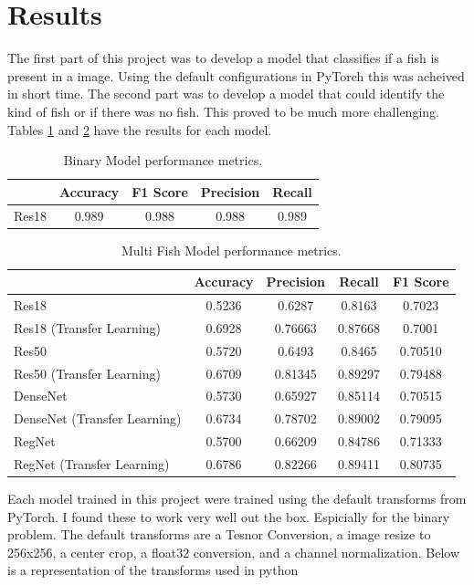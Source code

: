 \section{Results}
The first part of this project was to develop a model that classifies if a fish is present in a image. 
Using the default configurations in PyTorch this was acheived in short time.
The second part was to develop a model that could identify the kind of fish or if there was no fish. 
This proved to be much more challenging. 
Tables \ref{tab:binarymetrics} and \ref{tab:multimetrics} have the results for each model.


\begin{table}[!ht]
    \centering
    \begin{tabular}{lcccc}
        \hline
        & Accuracy & F1 Score & Precision & Recall \\
        \hline
        Res18 & 0.989 & 0.988 & 0.988 & 0.989 \\
        \hline
    \end{tabular}
    \caption{Binary Model performance metrics.}
    \label{tab:binarymetrics}
\end{table}


\begin{table}[!ht]
    \centering
    \begin{tabular}{lcccc}
        \hline
        & Accuracy & Precision & Recall & F1 Score \\
        \hline
        Res18  & 0.5236 & 0.6287 & 0.8163 & 0.7023 \\
        Res18 (Transfer Learning) & 0.6928  & 0.76663 & 0.87668 & 0.7001 \\
        Res50 & 0.5720 & 0.6493 & 0.8465 & 0.70510 \\
        Res50 (Transfer Learning) & 0.6709 & 0.81345 & 0.89297 & 0.79488 \\
        DenseNet & 0.5730 & 0.65927 & 0.85114 & 0.70515 \\
        DenseNet (Transfer Learning) & 0.6734 & 0.78702 & 0.89002 & 0.79095 \\
        RegNet & 0.5700 & 0.66209 & 0.84786 & 0.71333 \\
        RegNet (Transfer Learning) & 0.6786 & 0.82266 & 0.89411 & 0.80735 \\
        \hline
    \end{tabular}
    \caption{Multi Fish Model performance metrics.}
    \label{tab:multimetrics}
\end{table}

Each model trained in this project were trained using the default transforms from PyTorch. I found these to work very well out the box. Espicially for the binary problem.
The default transforms are a Tesnor Conversion, a image resize to 256x256, a center crop, a float32 conversion, and a channel normalization.
Below is a representation of the transforms used in python

